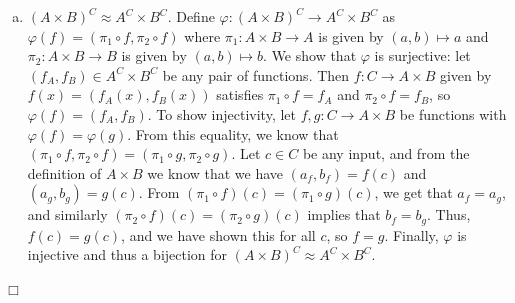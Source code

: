 \documentclass[12pt]{article}
\theoremstyle{definition}
\newenvironment{Solution}{\noindent {\sc Solution.}}{$\Box$ \vspace{2 ex}}
\begin{document}
\begin{Solution}
\begin{enumerate}[(a)]
\item $(A\times B)^C \approx A^C \times B^C$. Define $\varphi : (A\times B)^C \to A^C \times B^C$ as $\varphi(f) = (\pi_1 \circ f, \pi_2 \circ f)$ where $\pi_1 : A \times B \to A$ is given by $(a,b)\mapsto a$ and $\pi_2 : A \times B \to B$ is given by $(a,b)\mapsto b$. We show that $\varphi$ is surjective: let $(f_A,f_B) \in A^C \times B^C$ be any pair of functions. Then $f : C\to A \times B$ given by $f(x)=(f_A(x),f_B(x))$ satisfies $\pi_1 \circ f = f_A$ and $\pi_2 \circ f = f_B$, so $\varphi(f)=(f_A,f_B)$. To show injectivity, let $f,g:C \to A \times B$ be functions with $\varphi(f) = \varphi(g)$. From this equality, we know that $(\pi_1\circ f, \pi_2 \circ f) = (\pi_1 \circ g,\pi_2 \circ g)$. Let $c \in C$ be any input, and from the definition of $A \times B$ we know that we have $(a_f,b_f) = f(c)$ and $(a_g,b_g)=g(c)$. From $(\pi_1 \circ f)(c)= (\pi_1 \circ g)(c)$, we get that $a_f = a_g$, and similarly $(\pi_2 \circ f)(c) = (\pi_2 \circ g)(c)$ implies that $b_f = b_g$. Thus, $f(c)=g(c)$, and we have shown this for all $c$, so $f = g$. Finally, $\varphi$ is injective and thus a bijection for $(A \times B)^C \approx A^C \times B^C$.
\end{enumerate}
\end{Solution}

\vspace{0.5cm}
\end{document}
